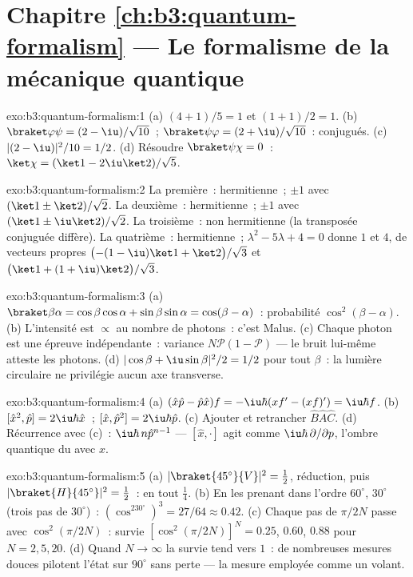 \section*{Chapitre \ref{ch:b3:quantum-formalism} --- Le formalisme de la mécanique quantique}

\begin{solution}{exo:b3:quantum-formalism:1}
(a) $(4 + 1)/5 = 1$ et $(1 + 1)/2 = 1$. (b) $\braket\varphi\psi =
(2 - \iu)/\sqrt{10}$~; $\braket\psi\varphi = (2 + \iu)/\sqrt{10}$~:
conjugués. (c) $|(2 - \iu)|^2/10 = 1/2$. (d) Résoudre
$\braket\psi\chi = 0$~: $\ket\chi = (\ket1 - 2\iu\ket2)/\sqrt5$.
\end{solution}

\begin{solution}{exo:b3:quantum-formalism:2}
La première~: hermitienne~; $\pm1$ avec $(\ket1 \pm \ket2)/\sqrt2$. La
deuxième~: hermitienne~; $\pm1$ avec $(\ket1 \pm \iu\ket2)/\sqrt2$. La
troisième~: non hermitienne (la transposée conjuguée diffère). La
quatrième~: hermitienne~; $\lambda^2 - 5\lambda + 4 = 0$ donne $1$ et
$4$, de vecteurs propres $\big({-(1 - \iu)}\ket1 + \ket2\big)/\sqrt3$ et $\big(\ket1 +
(1 + \iu)\ket2\big)/\sqrt3$.
\end{solution}

\begin{solution}{exo:b3:quantum-formalism:3}
(a) $\braket\beta\alpha = \cos\beta\cos\alpha + \sin\beta\sin\alpha
= \cos(\beta - \alpha)$~: probabilité $\cos^2(\beta - \alpha)$. (b)
L'intensité est $\propto$ au nombre de photons~: c'est Malus. (c)
Chaque photon est une épreuve indépendante~: variance
$N\mathcal P(1 - \mathcal P)$ --- le bruit lui-même atteste les
photons. (d) $|\cos\beta + \iu\sin\beta|^2/2
= 1/2$ pour tout $\beta$~: la lumière circulaire ne privilégie aucun
axe transverse.
\end{solution}

\begin{solution}{exo:b3:quantum-formalism:4}
(a) $(\hat x\hat p - \hat p\hat x)f = -\iu\hbar(xf' - (xf)') =
\iu\hbar f$. (b) $[\hat x^2, \hat p] = 2\iu\hbar\hat x$~; $[\hat x,
\hat p^2] = 2\iu\hbar\hat p$. (c) Ajouter et retrancher $\hat B\hat A
\hat C$. (d) Récurrence avec (c)~: $\iu\hbar\,n\hat p^{n-1}$ ---
$[\hat x, \cdot]$ agit comme $\iu\hbar\,\partial/\partial p$, l'ombre
quantique du  avec $x$.
\end{solution}

\begin{solution}{exo:b3:quantum-formalism:5}
(a) $|\braket{45^\circ}{V}|^2 = \tfrac12$, réduction, puis
$|\braket{H}{45^\circ}|^2 = \tfrac12$~: en tout $\tfrac14$. (b) En les
prenant dans l'ordre $60^\circ$, $30^\circ$ (trois pas de $30^\circ$)~:
$(\cos^230^\circ)^3 = 27/64 \approx 0.42$. (c) Chaque pas de
$\pi/2N$ passe avec $\cos^2(\pi/2N)$~: survie $[\cos^2(\pi/2N)]^N
= 0.25$, $0.60$, $0.88$ pour $N = 2, 5, 20$. (d) Quand $N \to \infty$
la survie tend vers $1$~: de nombreuses mesures douces pilotent l'état
sur $90^\circ$ sans perte --- la mesure employée comme un volant.
\end{solution}


